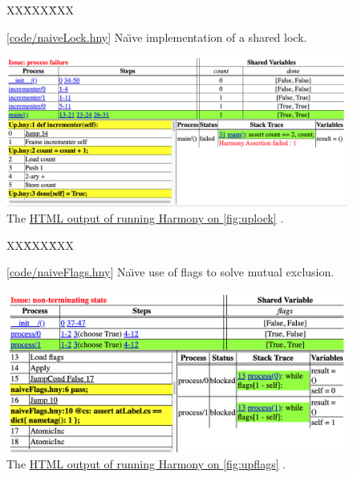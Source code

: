 \documentclass{report}
\newcommand{\harmonysource}[1]{
\begin{tabbing}
XX\=XXX\=XXX\kill
    
\end{tabbing}
}
\newcommand{\harmonylink}[1]{%
[\href{https://www.cs.cornell.edu/home/rvr/harmony/#1}{\underline{#1}}]%
}
\newcommand{\harmonyref}[2]{%
\href{https://www.cs.cornell.edu/home/rvr/harmony/output/#1}{\underline{#2}}%
}
\newenvironment{code}{
\tcolorbox
}{
\endtcolorbox
}
\begin{document}
\begin{figure}
\begin{code}
\harmonysource{naiveLock}
\end{code}
\caption{\harmonylink{code/naiveLock.hny} Na\"{\i}ve implementation of a shared lock.}
\label{fig:uplock}
\end{figure}

\begin{figure}
\includegraphics[width=\textwidth]{figures/naiveLock.png}
\caption{The \harmonyref{naiveLock.html}{HTML output of running Harmony on \autoref{fig:uplock}}.}
\label{fig:naiveLockhtml}
\end{figure}

\begin{figure}
\begin{code}
\harmonysource{naiveFlags}
\end{code}
\caption{\harmonylink{code/naiveFlags.hny} Na\"{\i}ve use of flags to solve mutual exclusion.}
\label{fig:upflags}
\end{figure}

\begin{figure}
\includegraphics[width=\textwidth]{figures/naiveFlags.png}
\caption{The \harmonyref{naiveFlags.html}{HTML output of running Harmony on \autoref{fig:upflags}}.}
\label{fig:naiveflagshtml}
\end{figure}
\end{document}

